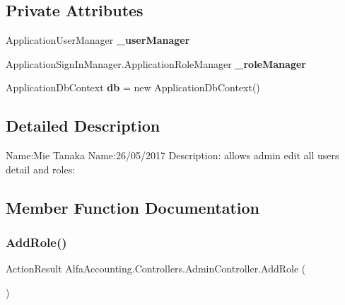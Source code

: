 \subsection*{Private Attributes}
\begin{DoxyCompactItemize}
\item 
\mbox{\label{class_alfa_accounting_1_1_controllers_1_1_admin_controller_a07ed864a13e44326f125f2f82c662b28}} 
Application\+User\+Manager {\bfseries \+\_\+user\+Manager}
\item 
\mbox{\label{class_alfa_accounting_1_1_controllers_1_1_admin_controller_a42b3851c6a9271d44931e8a81f21e05c}} 
Application\+Sign\+In\+Manager.\+Application\+Role\+Manager {\bfseries \+\_\+role\+Manager}
\item 
\mbox{\label{class_alfa_accounting_1_1_controllers_1_1_admin_controller_a8bdc93613c4724b2bc244a088b560026}} 
Application\+Db\+Context {\bfseries db} = new Application\+Db\+Context()
\end{DoxyCompactItemize}


\subsection{Detailed Description}


Name\+:Mie Tanaka Name\+:26/05/2017 Description\+: allows admin edit all users detail and roles\+: 

\subsection{Member Function Documentation}
\mbox{\label{class_alfa_accounting_1_1_controllers_1_1_admin_controller_a59853ef1d5370e88b096ff325cd1ff6f}} 
\subsubsection{\texorpdfstring{Add\+Role()}{AddRole()}\hspace{0.1cm}{\footnotesize\ttfamily [1/2]}}
{\footnotesize\ttfamily Action\+Result Alfa\+Accounting.\+Controllers.\+Admin\+Controller.\+Add\+Role (\begin{DoxyParamCaption}{ }\end{DoxyParamCaption})}



